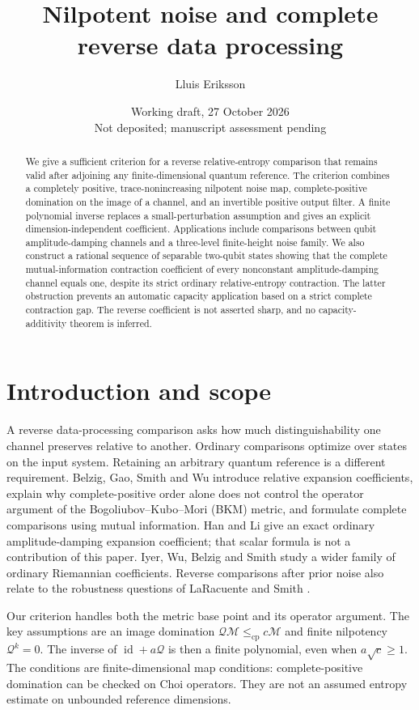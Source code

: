 \documentclass[11pt,a4paper]{article}
\title{Nilpotent noise and complete reverse data processing}
\author{Lluis Eriksson}
\date{Working draft, 27 October 2026\\Not deposited; manuscript assessment pending}
\theoremstyle{remark}\newtheorem{remark}[theorem]{Remark}
\newcommand{\id}{\operatorname{id}}
\newcommand{\cQ}{\mathcal Q}
\newcommand{\cM}{\mathcal M}
\newcommand{\cp}{\mathrm{cp}}
\begin{document}
\maketitle
\begin{abstract}
We give a sufficient criterion for a reverse relative-entropy comparison
that remains valid after adjoining any finite-dimensional quantum reference.
The criterion combines a completely positive, trace-nonincreasing nilpotent
noise map, complete-positive domination on the image of a channel, and an
invertible positive output filter. A finite polynomial inverse replaces a
small-perturbation assumption and gives an explicit dimension-independent
coefficient. Applications include comparisons between qubit
amplitude-damping channels and a three-level finite-height noise family.
We also construct a rational sequence of separable two-qubit states showing
that the complete mutual-information contraction coefficient of every
nonconstant amplitude-damping channel equals one, despite its strict
ordinary relative-entropy contraction. The latter obstruction prevents an
automatic capacity application based on a strict complete contraction gap.
The reverse coefficient is not asserted sharp, and no capacity-additivity
theorem is inferred.
\end{abstract}

\section{Introduction and scope}
A reverse data-processing comparison asks how much distinguishability one
channel preserves relative to another. Ordinary comparisons optimize over
states on the input system. Retaining an arbitrary quantum reference is a
different requirement. Belzig, Gao, Smith and Wu \cite{bgsw} introduce relative
expansion coefficients, explain why complete-positive order alone does not
control the operator argument of the Bogoliubov--Kubo--Mori (BKM) metric, and
formulate complete comparisons using mutual information. Han and Li
\cite{hanli} give an exact ordinary amplitude-damping expansion coefficient;
that scalar formula is not a contribution of this paper.
Iyer, Wu, Belzig and Smith \cite{iyer} study a wider family of ordinary
Riemannian coefficients. Reverse comparisons after prior noise also relate
to the robustness questions of LaRacuente and Smith \cite{laracuente}.

Our criterion handles both the metric base point and its operator argument.
The key assumptions are an image domination
$\cQ\cM\leq_{\cp}c\cM$ and finite nilpotency $\cQ^k=0$.
The inverse of $\id+a\cQ$ is then a finite polynomial, even when
$a\sqrt c\geq1$. The conditions are finite-dimensional map conditions:
complete-positive domination can be checked on Choi operators. They are
not an assumed entropy estimate on unbounded reference dimensions.
\end{document}
